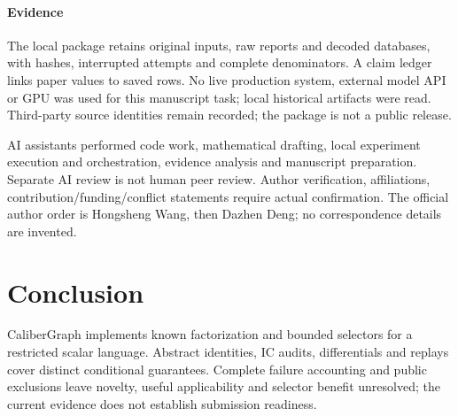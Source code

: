 \documentclass[3p,times,authoryear]{elsarticle}
\begin{document}
\paragraph{Evidence}
The local package retains original inputs, raw reports and decoded databases, with hashes, interrupted attempts and complete denominators. A claim ledger links paper values to saved rows. No live production system, external model API or GPU was used for this manuscript task; local historical artifacts were read. Third-party source identities remain recorded; the package is not a public release.

AI assistants performed code work, mathematical drafting, local experiment execution and orchestration, evidence analysis and manuscript preparation. Separate AI review is not human peer review. Author verification, affiliations, contribution/funding/conflict statements require actual confirmation. The official author order is Hongsheng Wang, then Dazhen Deng; no correspondence details are invented.

\section{Conclusion}
CaliberGraph implements known factorization and bounded selectors for a restricted scalar language. Abstract identities, IC audits, differentials and replays cover distinct conditional guarantees. Complete failure accounting and public exclusions leave novelty, useful applicability and selector benefit unresolved; the current evidence does not establish submission readiness.



\end{document}

